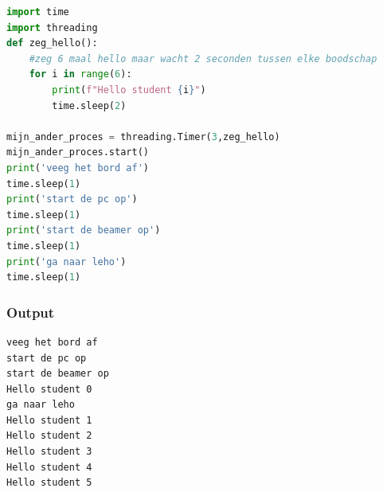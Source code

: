 \documentclass{article}
\begin{document}
\begin{lstlisting}[language=Python]
import time
import threading
def zeg_hello():
    #zeg 6 maal hello maar wacht 2 seconden tussen elke boodschap
    for i in range(6):
        print(f"Hello student {i}")
        time.sleep(2)

mijn_ander_proces = threading.Timer(3,zeg_hello)
mijn_ander_proces.start()
print('veeg het bord af')
time.sleep(1)
print('start de pc op')
time.sleep(1)
print('start de beamer op')
time.sleep(1)
print('ga naar leho')
time.sleep(1)
\end{lstlisting}

\subsubsection{Output}

\begin{lstlisting}[]
veeg het bord af
start de pc op
start de beamer op
Hello student 0
ga naar leho
Hello student 1
Hello student 2
Hello student 3
Hello student 4
Hello student 5
\end{lstlisting}
\end{document}
